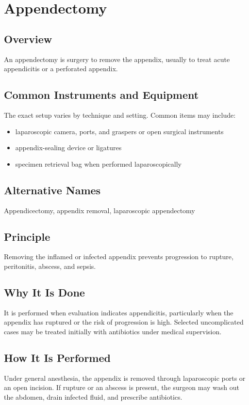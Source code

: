 \chapter{Appendectomy}

\section*{Overview}
An appendectomy is surgery to remove the appendix, usually to treat acute appendicitis or a perforated appendix.

\section*{Common Instruments and Equipment}
The exact setup varies by technique and setting. Common items may include:
\begin{itemize}[nosep,leftmargin=*]
  \item laparoscopic camera, ports, and graspers or open surgical instruments
  \item appendix-sealing device or ligatures
  \item specimen retrieval bag when performed laparoscopically
\end{itemize}

\section*{Alternative Names}
Appendicectomy, appendix removal, laparoscopic appendectomy

\section*{Principle}
Removing the inflamed or infected appendix prevents progression to rupture, peritonitis, abscess, and sepsis.

\section*{Why It Is Done}
It is performed when evaluation indicates appendicitis, particularly when the appendix has ruptured or the risk of progression is high. Selected uncomplicated cases may be treated initially with antibiotics under medical supervision.

\section*{How It Is Performed}
Under general anesthesia, the appendix is removed through laparoscopic ports or an open incision. If rupture or an abscess is present, the surgeon may wash out the abdomen, drain infected fluid, and prescribe antibiotics.

